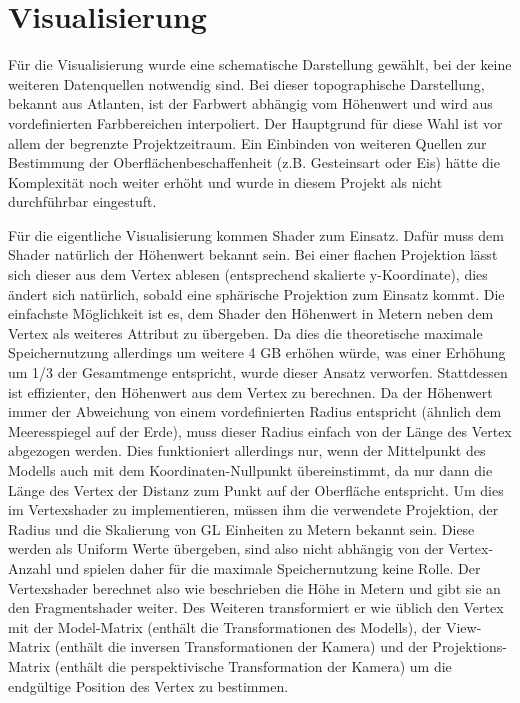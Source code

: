 \section{Visualisierung}
Für die Visualisierung wurde eine schematische Darstellung gewählt, bei der keine weiteren Datenquellen notwendig sind. Bei dieser topographische Darstellung, bekannt aus Atlanten, ist der Farbwert abhängig vom Höhenwert und wird aus vordefinierten Farbbereichen interpoliert. Der Hauptgrund für diese Wahl ist vor allem der begrenzte Projektzeitraum. Ein Einbinden von weiteren Quellen zur Bestimmung der Oberflächenbeschaffenheit (z.B. Gesteinsart oder Eis) hätte die Komplexität noch weiter erhöht und wurde in diesem Projekt als nicht durchführbar eingestuft.

Für die eigentliche Visualisierung kommen Shader zum Einsatz. Dafür muss dem Shader natürlich der Höhenwert bekannt sein. Bei einer flachen Projektion lässt sich dieser aus dem Vertex ablesen (entsprechend skalierte y-Koordinate), dies ändert sich natürlich, sobald eine sphärische Projektion zum Einsatz kommt. Die einfachste Möglichkeit ist es, dem Shader den Höhenwert in Metern neben dem Vertex als weiteres Attribut zu übergeben. Da dies die theoretische maximale Speichernutzung allerdings um weitere 4 GB erhöhen würde, was einer Erhöhung um 1/3 der Gesamtmenge entspricht, wurde dieser Ansatz verworfen. Stattdessen ist effizienter, den Höhenwert aus dem Vertex zu berechnen. Da der Höhenwert immer der Abweichung von einem vordefinierten Radius entspricht (ähnlich dem Meeresspiegel auf der Erde), muss dieser Radius einfach von der Länge des Vertex abgezogen werden. Dies funktioniert allerdings nur, wenn der Mittelpunkt des Modells auch mit dem Koordinaten-Nullpunkt übereinstimmt, da nur dann die Länge des Vertex der Distanz zum Punkt auf der Oberfläche entspricht. Um dies im Vertexshader zu implementieren, müssen ihm die verwendete Projektion, der Radius und die Skalierung von GL Einheiten zu Metern bekannt sein. Diese werden als Uniform Werte übergeben, sind also nicht abhängig von der Vertex-Anzahl und spielen daher für die maximale Speichernutzung keine Rolle. Der Vertexshader berechnet also wie beschrieben die Höhe in Metern und gibt sie an den Fragmentshader weiter. Des Weiteren transformiert er wie üblich den Vertex mit der Model-Matrix (enthält die Transformationen des Modells), der View-Matrix (enthält die inversen Transformationen der Kamera) und der Projektions-Matrix (enthält die perspektivische Transformation der Kamera) um die endgültige Position des Vertex zu bestimmen.

